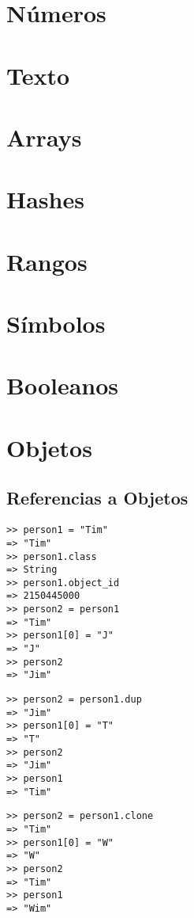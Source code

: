 \section{Números}

\section{Texto}
\section{Arrays}
\section{Hashes}
\section{Rangos}
\section{Símbolos}
\section{Booleanos}

\section{Objetos}
\label{section:objetos}

\subsection{Referencias a Objetos}

\begin{verbatim}
>> person1 = "Tim"
=> "Tim"
>> person1.class
=> String
>> person1.object_id
=> 2150445000
>> person2 = person1
=> "Tim"
>> person1[0] = "J"
=> "J"
>> person2
=> "Jim"
\end{verbatim}

\begin{verbatim}
>> person2 = person1.dup
=> "Jim"
>> person1[0] = "T"
=> "T"
>> person2
=> "Jim"
>> person1
=> "Tim"
\end{verbatim}

\begin{verbatim}
>> person2 = person1.clone
=> "Tim"
>> person1[0] = "W"
=> "W"
>> person2
=> "Tim"
>> person1
=> "Wim"
\end{verbatim}

